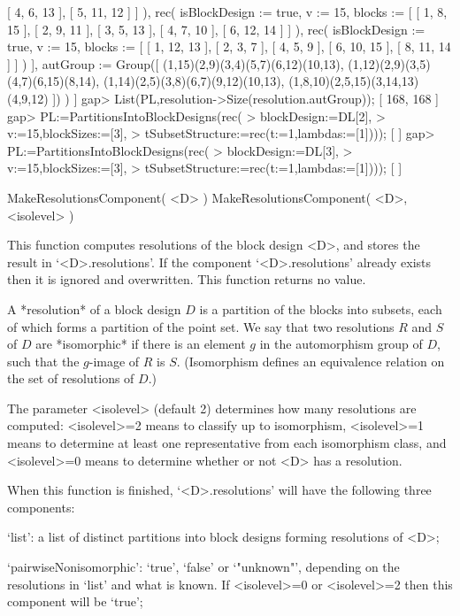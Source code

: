                   [ 4, 6, 13 ], [ 5, 11, 12 ] ] ), 
          rec( isBlockDesign := true, v := 15, 
              blocks := [ [ 1, 8, 15 ], [ 2, 9, 11 ], [ 3, 5, 13 ], 
                  [ 4, 7, 10 ], [ 6, 12, 14 ] ] ), 
          rec( isBlockDesign := true, v := 15, 
              blocks := [ [ 1, 12, 13 ], [ 2, 3, 7 ], [ 4, 5, 9 ], 
                  [ 6, 10, 15 ], [ 8, 11, 14 ] ] ) ], 
      autGroup := Group([ (1,15)(2,9)(3,4)(5,7)(6,12)(10,13), 
          (1,12)(2,9)(3,5)(4,7)(6,15)(8,14), 
          (1,14)(2,5)(3,8)(6,7)(9,12)(10,13), 
          (1,8,10)(2,5,15)(3,14,13)(4,9,12) ]) ) ]
gap> List(PL,resolution->Size(resolution.autGroup));
[ 168, 168 ]
gap> PL:=PartitionsIntoBlockDesigns(rec(
>       blockDesign:=DL[2],
>       v:=15,blockSizes:=[3],
>       tSubsetStructure:=rec(t:=1,lambdas:=[1])));
[  ]
gap> PL:=PartitionsIntoBlockDesigns(rec(
>       blockDesign:=DL[3],
>       v:=15,blockSizes:=[3],
>       tSubsetStructure:=rec(t:=1,lambdas:=[1])));
[  ]
\endexample


\>MakeResolutionsComponent( <D> )
\>MakeResolutionsComponent( <D>, <isolevel> )

This function computes resolutions of the block design <D>, and stores
the result in `<D>.resolutions'. If the component `<D>.resolutions' 
already exists then it is ignored and overwritten. 
This function returns no value.
 
A *resolution* of a block design $D$ is a partition of the blocks into
subsets, each of which forms a partition of the point set.  We say that
two resolutions $R$ and $S$ of $D$ are *isomorphic* if there is an element
$g$ in the automorphism group of $D$, such that the $g$-image of $R$
is $S$. (Isomorphism defines an equivalence relation on the set of
resolutions of $D$.)

The parameter <isolevel> (default 2) determines how many resolutions are
computed: <isolevel>=2 means to classify up to isomorphism, <isolevel>=1
means to determine at least one representative from each isomorphism
class, and <isolevel>=0 means to determine whether or not <D> has
a resolution.

When this function is finished, `<D>.resolutions' will have the following
three components:

`list': a list of distinct partitions into block designs forming resolutions
of <D>;

`pairwiseNonisomorphic': `true', `false' or `"unknown"', depending on the
resolutions in `list' and what is known. If <isolevel>=0 or <isolevel>=2
then this component will be `true';


